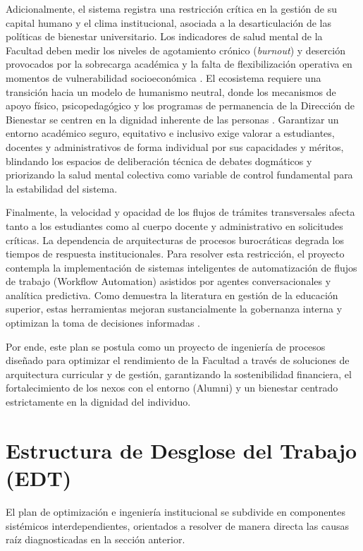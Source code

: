\documentclass[journal,10pt,twocolumn,letterpaper]{IEEEtran}
\begin{document}
Adicionalmente, el sistema registra una restricción crítica en la gestión de su capital humano y el clima institucional, asociada a la desarticulación de las políticas de bienestar universitario. Los indicadores de salud mental de la Facultad deben medir los niveles de agotamiento crónico (\textit{burnout}) y deserción provocados por la sobrecarga académica y la falta de flexibilización operativa en momentos de vulnerabilidad socioeconómica \cite{planeacion_unal_cifras}. El ecosistema requiere una transición hacia un modelo de humanismo neutral, donde los mecanismos de apoyo físico, psicopedagógico y los programas de permanencia de la Dirección de Bienestar se centren en la dignidad inherente de las personas \cite{clima_aula_superior2}. Garantizar un entorno académico seguro, equitativo e inclusivo exige valorar a estudiantes, docentes y administrativos de forma individual por sus capacidades y méritos, blindando los espacios de deliberación técnica de debates dogmáticos y priorizando la salud mental colectiva como variable de control fundamental para la estabilidad del sistema.

Finalmente, la velocidad y opacidad de los flujos de trámites transversales afecta tanto a los estudiantes como al cuerpo docente y administrativo en solicitudes críticas. La dependencia de arquitecturas de procesos burocráticas degrada los tiempos de respuesta institucionales. Para resolver esta restricción, el proyecto contempla la implementación de sistemas inteligentes de automatización de flujos de trabajo (Workflow Automation) asistidos por agentes conversacionales y analítica predictiva. Como demuestra la literatura en gestión de la educación superior, estas herramientas mejoran sustancialmente la gobernanza interna y optimizan la toma de decisiones informadas \cite{ia_administracion_u}.

Por ende, este plan se postula como un proyecto de ingeniería de procesos diseñado para optimizar el rendimiento de la Facultad a través de soluciones de arquitectura curricular y de gestión, garantizando la sostenibilidad financiera, el fortalecimiento de los nexos con el entorno (Alumni) y un bienestar centrado estrictamente en la dignidad del individuo.

\section{Estructura de Desglose del Trabajo (EDT)}
El plan de optimización e ingeniería institucional se subdivide en componentes sistémicos interdependientes, orientados a resolver de manera directa las causas raíz diagnosticadas en la sección anterior.
\end{document}
